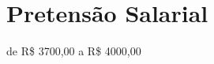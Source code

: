 \documentclass[a4paper,12pt]{article}
\begin{document}
\section{Pretensão Salarial}
de R\$ 3700,00 a R\$ 4000,00





\vfill
{}
\end{document}
